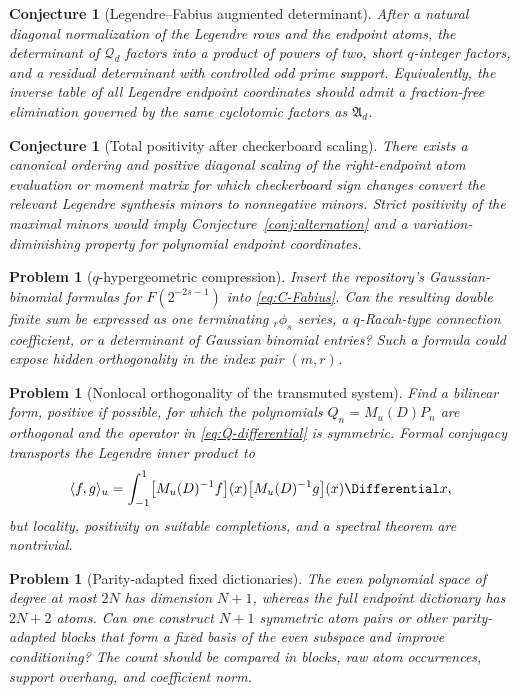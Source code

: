 \documentclass[11pt,oneside]{article}
\newtheorem{conjecture}[theorem]{Conjecture}
\newtheorem{problem}[theorem]{Problem}
\theoremstyle{definition}
\theoremstyle{remark}
\newcommand{\cQ}{\mathcal Q}
\begin{document}
\begin{conjecture}[Legendre--Fabius augmented determinant]
\label{conj:augdet}
After a natural diagonal normalization of the Legendre rows and the endpoint
atoms, the determinant of $\cQ_d$ factors into a product of powers of two,
short $q$-integer factors, and a residual determinant with controlled odd
prime support.  Equivalently, the inverse table of all Legendre endpoint
coordinates should admit a fraction-free elimination governed by the same
cyclotomic factors as $\mathfrak A_d$.
\end{conjecture}

\begin{conjecture}[Total positivity after checkerboard scaling]
\label{conj:total-positivity}
There exists a canonical ordering and positive diagonal scaling of the
right-endpoint atom evaluation or moment matrix for which checkerboard sign
changes convert the relevant Legendre synthesis minors to nonnegative
minors.  Strict positivity of the maximal minors would imply
Conjecture~\ref{conj:alternation} and a variation-diminishing property for
polynomial endpoint coordinates.
\end{conjecture}

\begin{problem}[$q$-hypergeometric compression]
Insert the repository's Gaussian-binomial formulas for
$F(2^{-2s-1})$ into \eqref{eq:C-Fabius}.  Can the resulting double finite sum
be expressed as one terminating ${}_r\phi_s$ series, a $q$-Racah-type
connection coefficient, or a determinant of Gaussian binomial entries?  Such
a formula could expose hidden orthogonality in the index pair $(m,r)$.
\end{problem}

\begin{problem}[Nonlocal orthogonality of the transmuted system]
Find a bilinear form, positive if possible, for which the polynomials
$Q_n=M_u(D)P_n$ are orthogonal and the operator in
\eqref{eq:Q-differential} is symmetric.  Formal conjugacy transports the
Legendre inner product to
\begin{equation}
 \langle f,g\rangle_u
 =\int_{-1}^{1}\bigl[M_u(D)^{-1}f\bigr](x)
                 \bigl[M_u(D)^{-1}g\bigr](x)\Differential x,
 \label{eq:formal-inner-product}
\end{equation}
but locality, positivity on suitable completions, and a spectral theorem are
nontrivial.
\end{problem}

\begin{problem}[Parity-adapted fixed dictionaries]
The even polynomial space of degree at most $2N$ has dimension $N+1$, whereas
the full endpoint dictionary has $2N+2$ atoms.  Can one construct $N+1$
symmetric atom pairs or other parity-adapted blocks that form a fixed basis of
the even subspace and improve conditioning?  The count should be compared in
blocks, raw atom occurrences, support overhang, and coefficient norm.
\end{problem}
\end{document}
